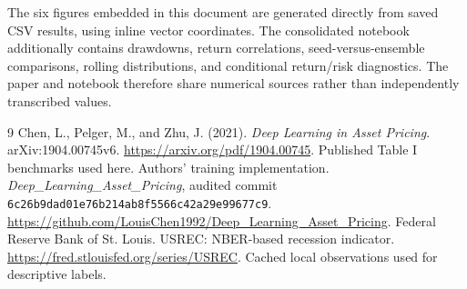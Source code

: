 \documentclass[11pt]{article}
\begin{document}
The six figures embedded in this document are generated directly from saved CSV results, using inline vector coordinates. The consolidated notebook additionally contains drawdowns, return correlations, seed-versus-ensemble comparisons, rolling distributions, and conditional return/risk diagnostics. The paper and notebook therefore share numerical sources rather than independently transcribed values.
\begin{thebibliography}{9}
 Chen, L., Pelger, M., and Zhu, J. (2021). \emph{Deep Learning in Asset Pricing}. arXiv:1904.00745v6. \url{https://arxiv.org/pdf/1904.00745}. Published Table I benchmarks used here.
 Authors' training implementation. \emph{Deep\_Learning\_Asset\_Pricing}, audited commit \texttt{6c26b9dad01e76b214ab8f5566c42a29e99677c9}. \url{https://github.com/LouisChen1992/Deep_Learning_Asset_Pricing}.
 Federal Reserve Bank of St. Louis. USREC: NBER-based recession indicator. \url{https://fred.stlouisfed.org/series/USREC}. Cached local observations used for descriptive labels.
\end{thebibliography}
\end{document}
